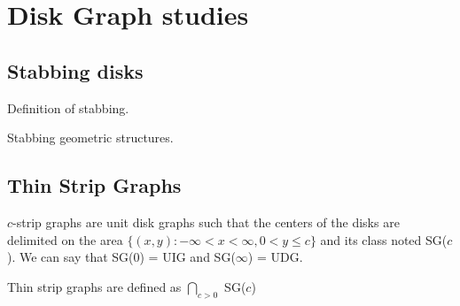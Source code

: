 \chapter{Disk Graph studies}

\section{Stabbing disks}

Definition of stabbing.

Stabbing geometric structures.\cite{schlipf2013stabbing}

\section{Thin Strip Graphs}

$c$-strip graphs are unit disk graphs such that the centers of the disks are delimited on the area $\{(x,y) : -\infty < x < \infty, 0 < y \leq c\}$ and its class noted SG($c$). We can say that SG(0) = UIG and SG($\infty$) = UDG. \cite{hayashiThinStripGraphs2017}

Thin strip graphs are defined as $\bigcap_{c > 0}$ SG($c$)
